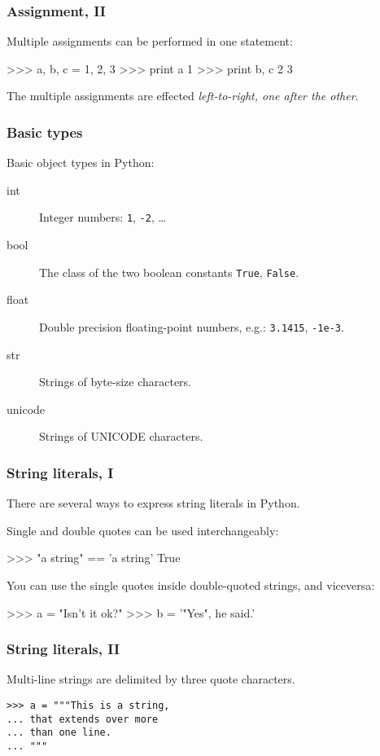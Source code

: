 \documentclass[english,serif,mathserif,xcolor=pdftex,dvipsnames,table]{beamer}
\begin{document}
\begin{frame}[fragile]
  \frametitle{Assignment, II}
  Multiple assignments can be performed in one statement:
\begin{semiverbatim}
>>> a, b, c = 1, 2, 3
>>> print a
1
>>> print b, c
2 3
\end{semiverbatim}

  The multiple assignments are effected \emph{left-to-right, one after
  the other}.

\end{frame}


\begin{frame}
  \frametitle{Basic types}
  Basic object types in Python:
  \begin{description}
  \item[int] Integer numbers: \texttt{1}, \texttt{-2}, \ldots
  \item[bool] The class of the two boolean constants \texttt{True}, \texttt{False}.
  \item[float] Double precision floating-point numbers, e.g.:
    \texttt{3.1415}, \texttt{-1e-3}.
  \item[str] Strings of byte-size characters.
  \item[unicode] Strings of UNICODE characters.
  \end{description}
\end{frame}

\begin{frame}[fragile]
  \frametitle{String literals, I}
  There are several ways to express string literals in Python.

  \+
  Single and double quotes can be used interchangeably:
\begin{semiverbatim}
>>> "a string" == 'a string'
True
\end{semiverbatim}

  \+
  You can use the single quotes inside double-quoted strings, and viceversa:
\begin{semiverbatim}
>>> a = "Isn't it ok?"
>>> b = '"Yes", he said.'
\end{semiverbatim}
\end{frame}


\begin{frame}[fragile]
  \frametitle{String literals, II}
  Multi-line strings are delimited by three quote characters.
\begin{lstlisting}
>>> a = """This is a string,
... that extends over more
... than one line.
... """
\end{lstlisting}
\end{frame}
\end{document}
